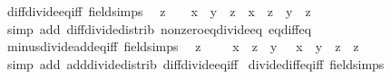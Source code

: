 \begin{isabellebody}
\isanewline
%
\endisadelimproof
\isanewline
{}\isamarkupfalse%
\ diff{\isacharunderscore}{\kern0pt}divide{\isacharunderscore}{\kern0pt}eq{\isacharunderscore}{\kern0pt}iff\ {\isacharbrackleft}{\kern0pt}field{\isacharunderscore}{\kern0pt}simps{\isacharbrackright}{\kern0pt}{\isacharcolon}{\kern0pt}\isanewline
\ \ {\isachardoublequoteopen}z\ {\isasymnoteq}\ {}\ {\isasymLongrightarrow}\ x\ {\isacharminus}{\kern0pt}\ y\ {\isacharslash}{\kern0pt}\ z\ {\isacharequal}{\kern0pt}\ {\isacharparenleft}{\kern0pt}x\ {\isacharasterisk}{\kern0pt}\ z\ {\isacharminus}{\kern0pt}\ y{\isacharparenright}{\kern0pt}\ {\isacharslash}{\kern0pt}\ z{\isachardoublequoteclose}\isanewline
%
\isadelimproof
\ \ %
\endisadelimproof
%
\isatagproof
{}\isamarkupfalse%
\ {\isacharparenleft}{\kern0pt}simp\ add{\isacharcolon}{\kern0pt}\ diff{\isacharunderscore}{\kern0pt}divide{\isacharunderscore}{\kern0pt}distrib\ nonzero{\isacharunderscore}{\kern0pt}eq{\isacharunderscore}{\kern0pt}divide{\isacharunderscore}{\kern0pt}eq\ eq{\isacharunderscore}{\kern0pt}diff{\isacharunderscore}{\kern0pt}eq{\isacharparenright}{\kern0pt}%
\endisatagproof
{\isafoldproof}%
%
\isadelimproof
\isanewline
%
\endisadelimproof
\isanewline
{}\isamarkupfalse%
\ minus{\isacharunderscore}{\kern0pt}divide{\isacharunderscore}{\kern0pt}add{\isacharunderscore}{\kern0pt}eq{\isacharunderscore}{\kern0pt}iff\ {\isacharbrackleft}{\kern0pt}field{\isacharunderscore}{\kern0pt}simps{\isacharbrackright}{\kern0pt}{\isacharcolon}{\kern0pt}\isanewline
\ \ {\isachardoublequoteopen}z\ {\isasymnoteq}\ {}\ {\isasymLongrightarrow}\ {\isacharminus}{\kern0pt}\ {\isacharparenleft}{\kern0pt}x\ {\isacharslash}{\kern0pt}\ z{\isacharparenright}{\kern0pt}\ {\isacharplus}{\kern0pt}\ y\ {\isacharequal}{\kern0pt}\ {\isacharparenleft}{\kern0pt}{\isacharminus}{\kern0pt}\ x\ {\isacharplus}{\kern0pt}\ y\ {\isacharasterisk}{\kern0pt}\ z{\isacharparenright}{\kern0pt}\ {\isacharslash}{\kern0pt}\ z{\isachardoublequoteclose}\isanewline
%
\isadelimproof
\ \ %
\endisadelimproof
%
\isatagproof
{}\isamarkupfalse%
\ {\isacharparenleft}{\kern0pt}simp\ add{\isacharcolon}{\kern0pt}\ add{\isacharunderscore}{\kern0pt}divide{\isacharunderscore}{\kern0pt}distrib\ diff{\isacharunderscore}{\kern0pt}divide{\isacharunderscore}{\kern0pt}eq{\isacharunderscore}{\kern0pt}iff{\isacharparenright}{\kern0pt}%
\endisatagproof
{\isafoldproof}%
%
\isadelimproof
\isanewline
%
\endisadelimproof
\isanewline
{}\isamarkupfalse%
\ divide{\isacharunderscore}{\kern0pt}diff{\isacharunderscore}{\kern0pt}eq{\isacharunderscore}{\kern0pt}iff\ {\isacharbrackleft}{\kern0pt}field{\isacharunderscore}{\kern0pt}simps{\isacharbrackright}{\kern0pt}{\isacharcolon}{\kern0pt}\isanewline

\end{isabellebody}
